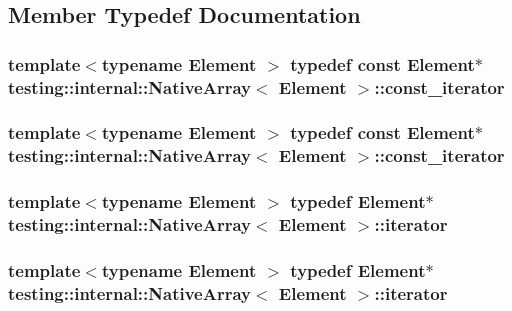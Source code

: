 \subsection{Member Typedef Documentation}
\hypertarget{classtesting_1_1internal_1_1_native_array_a9ce7c8408460d7158a2870456d134557}{
\subsubsection[{const\-\_\-iterator}]{\setlength{\rightskip}{0pt plus 5cm}template$<$typename Element $>$ typedef const Element$\ast$ {\bf testing\-::internal\-::\-Native\-Array}$<$ Element $>$\-::{\bf const\-\_\-iterator}}}\label{classtesting_1_1internal_1_1_native_array_a9ce7c8408460d7158a2870456d134557}
\hypertarget{classtesting_1_1internal_1_1_native_array_a9ce7c8408460d7158a2870456d134557}{
\subsubsection[{const\-\_\-iterator}]{\setlength{\rightskip}{0pt plus 5cm}template$<$typename Element $>$ typedef const Element$\ast$ {\bf testing\-::internal\-::\-Native\-Array}$<$ Element $>$\-::{\bf const\-\_\-iterator}}}\label{classtesting_1_1internal_1_1_native_array_a9ce7c8408460d7158a2870456d134557}
\hypertarget{classtesting_1_1internal_1_1_native_array_ac1301a57977b57a1ad013e4e25fc2a72}{
\subsubsection[{iterator}]{\setlength{\rightskip}{0pt plus 5cm}template$<$typename Element $>$ typedef Element$\ast$ {\bf testing\-::internal\-::\-Native\-Array}$<$ Element $>$\-::{\bf iterator}}}\label{classtesting_1_1internal_1_1_native_array_ac1301a57977b57a1ad013e4e25fc2a72}
\hypertarget{classtesting_1_1internal_1_1_native_array_ac1301a57977b57a1ad013e4e25fc2a72}{
\subsubsection[{iterator}]{\setlength{\rightskip}{0pt plus 5cm}template$<$typename Element $>$ typedef Element$\ast$ {\bf testing\-::internal\-::\-Native\-Array}$<$ Element $>$\-::{\bf iterator}}}\label{classtesting_1_1internal_1_1_native_array_ac1301a57977b57a1ad013e4e25fc2a72}
